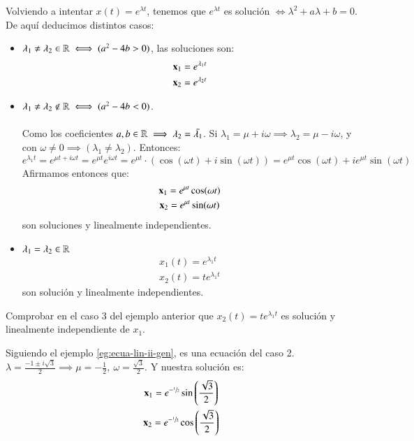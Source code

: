 \begin{eg}[Ecuación lineal de orden 2: $\mbf{x}'' + a\mbf{x}' + b\mbf{x} = 0$]\label{eg:ecua-lin-ii-gen}
    Volviendo a intentar $x(t) = e^{\lambda t}$, tenemos que $e^{\lambda t}$ es solución $\iff \lambda^2+a\lambda+b=0$. De aquí deducimos distintos casos:
        \begin{itemize}
            \item $\lambda_1 \neq \lambda_2 \in \mathbb{R} \iff (a^2 - 4b > 0)$, las soluciones son:
            \begin{gather*}
                \mathbf{x}_1 = e^{\lambda_1 t} \\ \mathbf{x}_2 = e^{\lambda_2 t}
            \end{gather*}
            \item $\lambda_1 \neq \lambda_2 \not\in \mathbb{R} \iff (a^2 - 4b < 0)$.\\\\
            Como los coeficientes $a,b \in \mathbb{R} \implies \lambda_2 = \bar{\lambda_1}$. Si $\lambda_1 = \mu + i \omega \implies \lambda_2 = \mu - i \omega$, y con $\omega \neq 0 \implies (\lambda_1 \neq \lambda_2)$. Entonces:
            $$
                e^{\lambda_1 t} = e^{\mu t + i \omega t} = e^{\mu t} e^{i\omega t} = e^{\mu t} \cdot (\cos(\omega t) + i\sin(\omega t)) = e^{\mu t} \cos(\omega t) + i e^{\mu t} \sin (\omega t)
            $$
            Afirmamos entonces que:
            \begin{gather*}
                \mathbf{x}_1 = e^{\mu t} \cos(\omega t) \\ \mathbf{x}_2 = e^{\mu t} \sin(\omega t)
            \end{gather*}
            son soluciones y linealmente independientes.
            \item $\lambda_1 = \lambda_2 \in \mathbb{R}$
            \begin{gather*}
                x_1(t) = e^{\lambda_1 t} \\ x_2(t) = t e^{\lambda_1 t}
            \end{gather*} son solución y linealmente independientes.
        \end{itemize}
\end{eg}

\begin{th_ex}
    Comprobar en el caso 3 del ejemplo anterior que $x_2(t) = t e^{\lambda_1 t}$ es solución y linealmente independiente de $x_1$.
\end{th_ex}

\begin{eg}[Ecuación lineal de orden 2: $ \mbf{x}'' + \mbf{x}' + \mbf{x} = 0 $]
    Siguiendo el ejemplo \ref{eg:ecua-lin-ii-gen}, es una ecuación del caso 2. $\lambda = \frac{-1 \pm i\sqrt{3}}{2} \implies \mu = -\frac{1}{2},\ \omega = \frac{\sqrt{3}}{2}$. Y nuestra solución es:
    \begin{gather*}
        \mathbf{x}_1 = e^{-\sfrac{1}{2}} \sin\left(\frac{\sqrt{3}}{2}\right) \\ \mathbf{x}_2 = e^{-\sfrac{1}{2}} \cos\left(\frac{\sqrt{3}}{2}\right)
    \end{gather*}
\end{eg}

